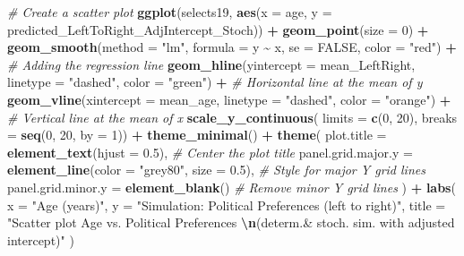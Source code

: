 \documentclass[
]{book}
\newenvironment{Shaded}{\begin{snugshade}}{\end{snugshade}}
\newcommand{\AttributeTok}[1]{\textcolor[rgb]{0.13,0.29,0.53}{#1}}
\newcommand{\CommentTok}[1]{\textcolor[rgb]{0.56,0.35,0.01}{\textit{#1}}}
\newcommand{\ConstantTok}[1]{\textcolor[rgb]{0.56,0.35,0.01}{#1}}
\newcommand{\DecValTok}[1]{\textcolor[rgb]{0.00,0.00,0.81}{#1}}
\newcommand{\FloatTok}[1]{\textcolor[rgb]{0.00,0.00,0.81}{#1}}
\newcommand{\FunctionTok}[1]{\textcolor[rgb]{0.13,0.29,0.53}{\textbf{#1}}}
\newcommand{\NormalTok}[1]{#1}
\newcommand{\SpecialCharTok}[1]{\textcolor[rgb]{0.81,0.36,0.00}{\textbf{#1}}}
\newcommand{\StringTok}[1]{\textcolor[rgb]{0.31,0.60,0.02}{#1}}
\begin{document}
\begin{Shaded}
\begin{Highlighting}[]
\CommentTok{\# Create a scatter plot}
\FunctionTok{ggplot}\NormalTok{(selects19, }\FunctionTok{aes}\NormalTok{(}\AttributeTok{x =}\NormalTok{ age, }\AttributeTok{y =}\NormalTok{ predicted\_LeftToRight\_AdjIntercept\_Stoch)) }\SpecialCharTok{+}
  \FunctionTok{geom\_point}\NormalTok{(}\AttributeTok{size =} \DecValTok{0}\NormalTok{) }\SpecialCharTok{+}
  \FunctionTok{geom\_smooth}\NormalTok{(}\AttributeTok{method =} \StringTok{"lm"}\NormalTok{, }\AttributeTok{formula =}\NormalTok{ y }\SpecialCharTok{\textasciitilde{}}\NormalTok{ x, }\AttributeTok{se =} \ConstantTok{FALSE}\NormalTok{, }\AttributeTok{color =} \StringTok{"red"}\NormalTok{) }\SpecialCharTok{+}  \CommentTok{\# Adding the regression line}
  \FunctionTok{geom\_hline}\NormalTok{(}\AttributeTok{yintercept =}\NormalTok{ mean\_LeftRight, }\AttributeTok{linetype =} \StringTok{"dashed"}\NormalTok{, }\AttributeTok{color =} \StringTok{"green"}\NormalTok{) }\SpecialCharTok{+}  \CommentTok{\# Horizontal line at the mean of y}
  \FunctionTok{geom\_vline}\NormalTok{(}\AttributeTok{xintercept =}\NormalTok{ mean\_age, }\AttributeTok{linetype =} \StringTok{"dashed"}\NormalTok{, }\AttributeTok{color =} \StringTok{"orange"}\NormalTok{) }\SpecialCharTok{+}  \CommentTok{\# Vertical line at the mean of x}
  \FunctionTok{scale\_y\_continuous}\NormalTok{(}
    \AttributeTok{limits =} \FunctionTok{c}\NormalTok{(}\DecValTok{0}\NormalTok{, }\DecValTok{20}\NormalTok{),}
    \AttributeTok{breaks =} \FunctionTok{seq}\NormalTok{(}\DecValTok{0}\NormalTok{, }\DecValTok{20}\NormalTok{, }\AttributeTok{by =} \DecValTok{1}\NormalTok{)) }\SpecialCharTok{+}
  \FunctionTok{theme\_minimal}\NormalTok{() }\SpecialCharTok{+}
  \FunctionTok{theme}\NormalTok{(}
    \AttributeTok{plot.title =} \FunctionTok{element\_text}\NormalTok{(}\AttributeTok{hjust =} \FloatTok{0.5}\NormalTok{), }\CommentTok{\# Center the plot title}
    \AttributeTok{panel.grid.major.y =} \FunctionTok{element\_line}\NormalTok{(}\AttributeTok{color =} \StringTok{"grey80"}\NormalTok{, }\AttributeTok{size =} \FloatTok{0.5}\NormalTok{), }\CommentTok{\# Style for major Y grid lines}
    \AttributeTok{panel.grid.minor.y =} \FunctionTok{element\_blank}\NormalTok{() }\CommentTok{\# Remove minor Y grid lines}
\NormalTok{  ) }\SpecialCharTok{+}
  \FunctionTok{labs}\NormalTok{(}
    \AttributeTok{x =} \StringTok{"Age (years)"}\NormalTok{,}
    \AttributeTok{y =} \StringTok{"Simulation: Political Preferences (left to right)"}\NormalTok{,}
    \AttributeTok{title =} \StringTok{"Scatter plot Age vs. Political Preferences }\SpecialCharTok{\textbackslash{}n}\StringTok{(determ.\& stoch. sim. with adjusted intercept)"}
\NormalTok{  )}
\end{Highlighting}
\end{Shaded}
\end{document}
